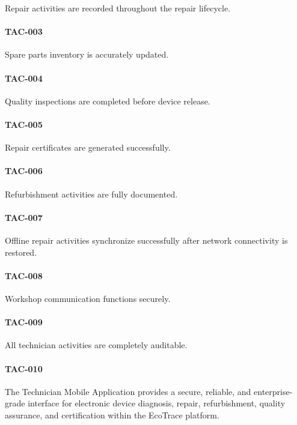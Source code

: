 Repair activities are recorded throughout the repair lifecycle.

\paragraph{TAC-003}

Spare parts inventory is accurately updated.

\paragraph{TAC-004}

Quality inspections are completed before device release.

\paragraph{TAC-005}

Repair certificates are generated successfully.

\paragraph{TAC-006}

Refurbishment activities are fully documented.

\paragraph{TAC-007}

Offline repair activities synchronize successfully after network
connectivity is restored.

\paragraph{TAC-008}

Workshop communication functions securely.

\paragraph{TAC-009}

All technician activities are completely auditable.

\paragraph{TAC-010}

The Technician Mobile Application provides a secure, reliable, and
enterprise-grade interface for electronic device diagnosis, repair,
refurbishment, quality assurance, and certification within the
EcoTrace platform.

